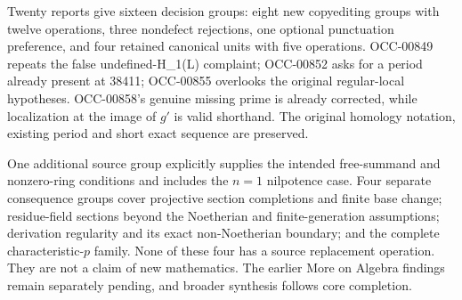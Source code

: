 Twenty reports give sixteen decision groups: eight new copyediting groups with twelve operations, three nondefect rejections, one optional punctuation preference, and four retained canonical units with five operations. OCC-00849 repeats the false undefined-H\_1(L) complaint; OCC-00852 asks for a period already present at 38411; OCC-00855 overlooks the original regular-local hypotheses. OCC-00858's genuine missing prime is already corrected, while localization at the image of \(g'\) is valid shorthand. The original homology notation, existing period and short exact sequence are preserved.

One additional source group explicitly supplies the intended free-summand and nonzero-ring conditions and includes the \(n=1\) nilpotence case. Four separate consequence groups cover projective section completions and finite base change; residue-field sections beyond the Noetherian and finite-generation assumptions; derivation regularity and its exact non-Noetherian boundary; and the complete characteristic-\(p\) family. None of these four has a source replacement operation. They are not a claim of new mathematics. The earlier More on Algebra findings remain separately pending, and broader synthesis follows core completion.
